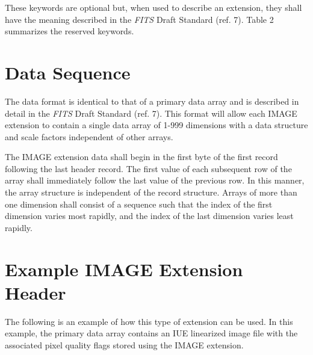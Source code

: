 These keywords are optional but, when used to describe an extension, they shall 
have the meaning described in the {\sl FITS} Draft Standard (ref. 7).
Table 2 summarizes the reserved keywords.
                                                                               
        



\section{Data Sequence}

The data format is identical to that of a primary data array and
is described in detail in the {\sl FITS} Draft Standard (ref. 7). 
This format will allow each IMAGE extension to contain a single data array
of 1-999 dimensions with a data structure and scale factors
independent of other arrays.

The IMAGE extension data shall begin in the first byte of the first
record following the last header record. 
The first value of each subsequent row of the array shall 
immediately follow the last value of the previous row. 
In this manner, the array structure is independent of the record structure. 
Arrays of more than one dimension shall consist of
a sequence such that the index of the first dimension varies most rapidly,
and the index of the last dimension varies least rapidly.

\newpage

\section{Example IMAGE Extension Header}

The following is an example of how this type of extension can be used.
In this example, the primary data array contains an IUE
linearized image file with the associated pixel quality flags stored
using the IMAGE extension. 


